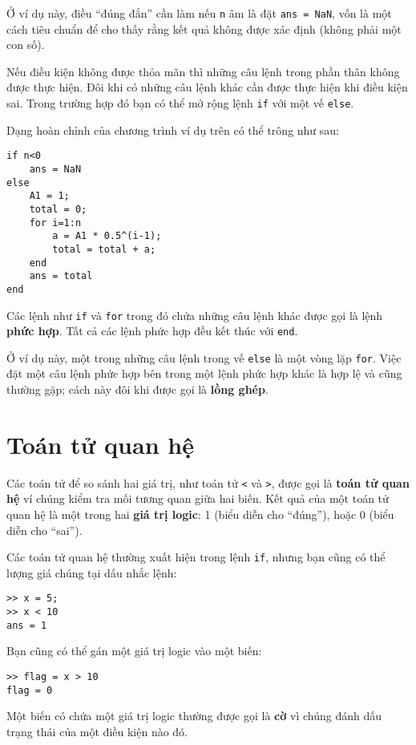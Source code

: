 \documentclass[12pt]{book}
\begin{document}
Ở ví dụ này, điều ``đúng đắn'' cần làm nếu {\tt n} âm là đặt
{\tt ans = NaN}, vốn là một cách tiêu chuẩn để cho thấy rằng
kết quả không được xác định (không phải một con số).

Nếu điều kiện không được thỏa mãn thì những câu lệnh trong phần thân
không được thực hiện. Đôi khi có những câu lệnh khác cần được
thực hiện khi điều kiện sai. Trong trường hợp đó bạn có thể
mở rộng lệnh {\tt if} với một vế {\tt else}.

Dạng hoàn chỉnh của chương trình ví dụ trên có thể trông như sau:

\begin{verbatim}
if n<0
    ans = NaN
else
    A1 = 1;
    total = 0;
    for i=1:n
        a = A1 * 0.5^(i-1);
        total = total + a;
    end
    ans = total
end
\end{verbatim}
%
Các lệnh như {\tt if} và {\tt for} trong đó chứa những câu lệnh khác
được gọi là lệnh {\bf phức hợp}. Tất cả các lệnh phức hợp đều 
kết thúc với {\tt end}.

Ở ví dụ này, một trong những câu lệnh trong vế {\tt else} là một 
vòng lặp {\tt for}. Việc đặt một câu lệnh phức hợp bên trong một
lệnh phức hợp khác là hợp lệ và cũng thường gặp; cách này đôi
khi được gọi là {\bf lồng ghép}.


\section{Toán tử quan hệ}

Các toán tử để so sánh hai giá trị, như toán tử {\tt <} và 
{\tt >}, được gọi là {\bf toán tử quan hệ} ví chúng kiểm tra 
mối tương quan giữa hai biến. Kết quả của một toán tử quan hệ
là một trong hai {\bf giá trị logic}: 1 (biểu diễn cho ``đúng''),
hoặc 0 (biểu diễn cho ``sai'').

Các toán tử quan hệ thường xuất hiện trong lệnh {\tt if},
nhưng bạn cũng có thể lượng giá chúng tại dấu nhắc lệnh:

\begin{verbatim}
>> x = 5;
>> x < 10
ans = 1
\end{verbatim}

Bạn cũng có thể gán một giá trị logic vào một biến:

\begin{verbatim}
>> flag = x > 10
flag = 0
\end{verbatim}

Một biến có chứa một giá trị logic thường được gọi là {\bf cờ}
vì chúng đánh dấu trạng thái của một điều kiện nào đó.
\end{document}
